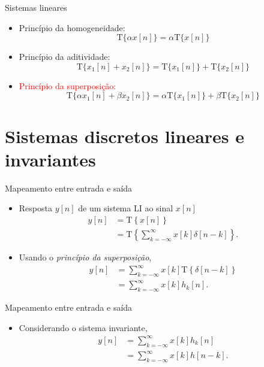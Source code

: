 \begin{slide}{Sistemas lineares}
   \begin{itemize}
       \item <1->Princípio da homogeneidade:
       \begin{equation*}
        \text{T}\{\alpha x[n]\} = \alpha \text{T}\{ x[n]\}
       \end{equation*}
       \item <2->Princípio da aditividade:
       \begin{equation*}
           \text{T}\{x_1[n]+x_2[n]\} = \text{T}\{x_1[n]\} + \text{T}\{x_2[n]\}
       \end{equation*}
       \item <3>\textcolor{red}{Princípio da superposição:}
       \begin{equation*}
     \text{T}\{\alpha x_1[n] + \beta x_2[n] \}= \alpha \text{T}\{x_1[n]\} + \beta \text{T}\{x_2[n]\}
    \end{equation*}
    \end{itemize} 
\end{slide}

\section[slide=true]{Sistemas discretos lineares e invariantes}
\begin{slide}{Mapeamento entre entrada e saída}
   \begin{itemize}
    \item <1->Resposta $y[n]$ de um sistema LI ao sinal $x[n]$
    \begin{align*}
        y[n]&=\text{T}\left \{ x[n] \right \}\\
            &=\text{T}\left \{ \sum_{k=-\infty}^{\infty}x[k]\delta [n-k] \right \}.
    \end{align*}
     \item <2-> Usando o \emph{princípio da superposição},
     \begin{align*}
        y[n]&=\sum_{k=-\infty}^{\infty}x[k]\text{T}\left \{ \delta [n-k] \right \}\\
            &=\sum_{k=-\infty}^{\infty}x[k]h_k[n].
     \end{align*}
   \end{itemize}
\end{slide}


\begin{slide}{Mapeamento entre entrada e saída}
   \begin{itemize}
    \item <1->Considerando o sistema invariante,
    \begin{align*}
        y[n]&=\sum_{k=-\infty}^{\infty}x[k]h_k[n]\\
            &=\sum_{k=-\infty}^{\infty}x[k]h[n-k].
     \end{align*}
   \end{itemize}
\end{slide}

